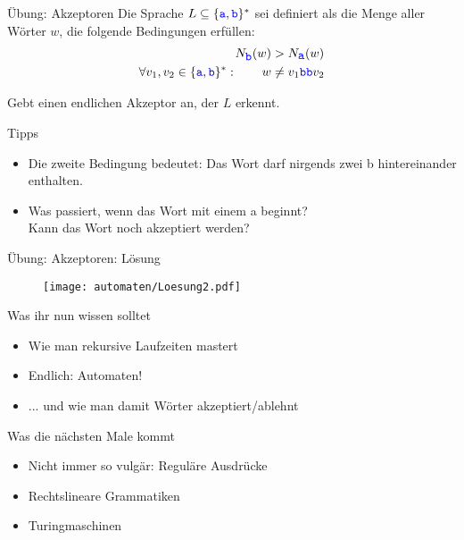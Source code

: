 \begin{frame}{Übung: Akzeptoren}
	Die Sprache $L\subseteq \{\hbox{\textcolor{blue}{\texttt{a}}},\hbox{\textcolor{blue}{\texttt{b}}}\}^\ast $ sei definiert als die Menge aller Wörter $w$, die folgende Bedingungen erfüllen:
	\begin{align*}
	N_{\hbox{\textcolor{blue}{\texttt{b}}}}(w) &> N_{\hbox{\textcolor{blue}{\texttt{a}}}}(w)\\ 
	\forall v_1,v_2 \in \{\hbox{\textcolor{blue}{\texttt{a}}},\hbox{\textcolor{blue}{\texttt{b}}}\}^\ast : \qquad w &\neq v_1 \hbox{\textcolor{blue}{\texttt{bb}}} v_2 
	\end{align*}
	
	Gebt einen endlichen Akzeptor an, der $L$ erkennt. \\
	
	\bigskip
	\pause
	\begin{block}{Tipps}
		\begin{itemize}[<+->]
			\item Die zweite Bedingung bedeutet: Das Wort darf nirgends zwei \word b hintereinander enthalten.
			\item Was passiert, wenn das Wort mit einem \word a beginnt?\\
			Kann das Wort noch akzeptiert werden?
		\end{itemize}
	\end{block}
\end{frame}

\begin{frame}{Übung: Akzeptoren: Lösung}
	\begin{figure}
		\centering
		\texttt{[image: automaten/Loesung2.pdf]}
	\end{figure}
\end{frame}

\begin{frame}	
	\begin{block}{Was ihr nun wissen solltet}
		\begin{itemize}
			\item Wie man rekursive Laufzeiten mastert
			\item Endlich: Automaten!
			\item ... und wie man damit Wörter akzeptiert/ablehnt
		\end{itemize}
	\end{block}
	
	\begin{block}{Was die nächsten Male kommt}
		\begin{itemize}
			\item Nicht immer so vulgär: Reguläre Ausdrücke
			\item Rechtslineare Grammatiken
			\item Turingmaschinen
		\end{itemize}
	\end{block}
\end{frame}





\slideThanks

